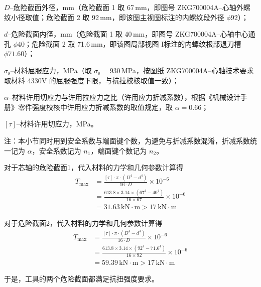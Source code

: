 $D$--危险截面外径，mm（危险截面 1 取 67\,mm，即图号 ZKG700004A--心轴外螺纹小径取值；危险截面 2 取 92\,mm，即该图主视图标注的内螺纹段外径 $\phi 92$）；

$d$--危险截面内径，mm（危险截面 1 取 40\,mm，即图号 ZKG700004A--心轴中心通孔 $\phi 40$；危险截面 2 取 71.6\,mm，即该图局部视图 I标注的内螺纹根部退刀槽 $\phi 71.60$）；

$\sigma_{\mathrm{s}}$--材料屈服应力，MPa（取 $\sigma_{\mathrm{s}}=930$\,MPa，按图纸 ZKG700004A--心轴技术要求取材料 4330V 的屈服强度下限，与抗拉校核取值一致）；

$\alpha$--材料许用切应力与许用拉应力之比（许用应力折减系数），根据《机械设计手册》零件强度校核中许用应力折减系数的取值规定\cite{ref26}，取 $\alpha = 0.66$；

$[\tau]$--材料许用切应力，MPa。

注：本小节同时用到安全系数与端面键个数，为避免与折减系数混淆，折减系数统一记为 $\alpha$，安全系数记为 $n_1$，端面键个数记为 $n_2$。

对于芯轴的危险截面1，代入材料的力学和几何参数计算得
\begin{equation}
    \begin{aligned}
        T_{\max} &= \frac{[\tau] \cdot \pi \cdot (D^4 - d^4)}{16 \cdot D} \times 10^{-6}  \\
        &= \frac{613.8 \times 3.14 \times (67^4 - 40^4)}{16 \times 67} \times 10^{-6}  \\
        &= 31.63\,\text{kN} \cdot \text{m} > 17\,\text{kN} \cdot \text{m}
    \end{aligned}
\end{equation}

对于危险截面2，代入材料的力学和几何参数计算得
\begin{equation}
    \begin{aligned}
        T_{\max} &= \frac{[\tau] \cdot \pi \cdot (D^4 - d^4)}{16 \cdot D} \times 10^{-6}  \\
        &= \frac{613.8 \times 3.14 \times (92^4 - 71.6^4)}{16 \times 92} \times 10^{-6}  \\
        &= 59.39\,\text{kN} \cdot \text{m} > 17\,\text{kN} \cdot \text{m}
    \end{aligned}
\end{equation}

于是，工具的两个危险截面都满足抗扭强度要求。

